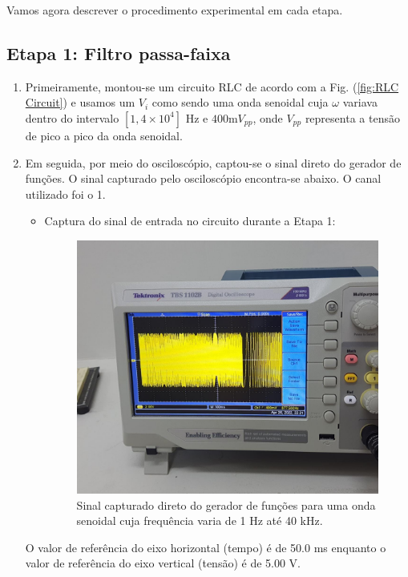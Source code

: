 \documentclass[letterpaper, 12pt]{article}
\begin{document}
Vamos agora descrever o procedimento experimental em cada etapa.
\subsection{Etapa 1: Filtro passa-faixa}\label{Etapa 1}
\begin{enumerate}
    \item Primeiramente, montou-se um circuito RLC de acordo com a Fig. (\ref{fig:RLC Circuit}) e usamos um $V_{i}$ como sendo uma onda senoidal cuja $\omega$ variava dentro do intervalo $[1,4\times10^{4}]$ Hz e $400\text{m}V_{pp}$, onde $V_{pp}$ representa a tensão de pico a pico da onda senoidal.
    
    \item Em seguida, por meio do osciloscópio, captou-se o sinal direto do gerador de funções. O sinal capturado pelo osciloscópio encontra-se abaixo. O canal utilizado foi o 1.
    
    \begin{itemize}
        \item Captura do sinal de entrada no circuito durante a Etapa 1:
        \begin{figure}[h]
            \centering
            \includegraphics[width=0.5\linewidth]{figures/Input_signal.jpeg}
            \caption{Sinal capturado direto do gerador de funções para uma onda senoidal cuja frequência varia de 1 Hz até 40 kHz.}
            \label{fig:Input_signal}
        \end{figure}
    \end{itemize}
    
    O valor de referência do eixo horizontal (tempo) é de 50.0 ms enquanto o valor de referência do eixo vertical (tensão) é de 5.00 V.
    

\end{enumerate}
\end{document}
